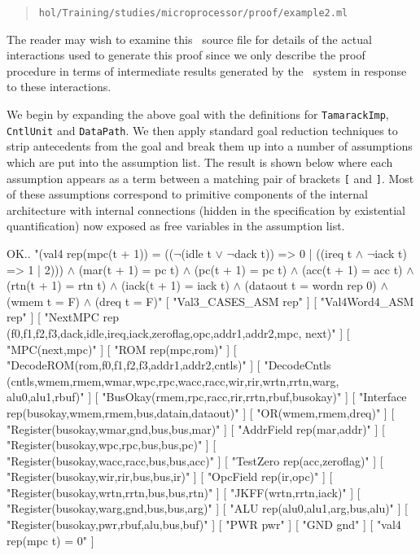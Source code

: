 \begin{quote}
\verb"hol/Training/studies/microprocessor/proof/example2.ml"
\end{quote}

The reader may wish to examine this \HOL\ source file for details
of the actual interactions used to generate this proof
since we only describe the proof procedure in terms
of intermediate results generated by the \HOL\ system
in response to these interactions.

We begin by expanding the above goal with the definitions
for \verb"TamarackImp", \verb"CntlUnit" and \verb"DataPath".
We then apply standard goal reduction techniques
to strip antecedents from the goal
and break them up into a number of assumptions which are put into
the assumption list.
The result is shown below where each assumption appears as a
term between a matching pair of brackets \verb"[" and \verb"]".
Most of these assumptions correspond to primitive components
of the internal architecture with internal connections
(hidden in the specification by existential quantification)
now exposed as free variables in the assumption list.

\begintt
OK..
"(val4 rep(mpc(t + 1)) =
  ((\(\neg\)(idle t \(\vee\) \(\neg\)dack t)) => 0 | ((ireq t \(\wedge\) \(\neg\)iack t) => 1 | 2))) \(\wedge\)
 (mar(t + 1) = pc t) \(\wedge\)
 (pc(t + 1) = pc t) \(\wedge\)
 (acc(t + 1) = acc t) \(\wedge\)
 (rtn(t + 1) = rtn t) \(\wedge\)
 (iack(t + 1) = iack t) \(\wedge\)
 (dataout t = wordn rep 0) \(\wedge\)
 (wmem t = F) \(\wedge\)
 (dreq t = F)"
    [ "Val3_CASES_ASM rep" ]
    [ "Val4Word4_ASM rep" ]
    [ "NextMPC 
       rep
       (f0,f1,f2,f3,dack,idle,ireq,iack,zeroflag,opc,addr1,addr2,mpc,
        next)" ]
    [ "MPC(next,mpc)" ]
    [ "ROM rep(mpc,rom)" ]
    [ "DecodeROM(rom,f0,f1,f2,f3,addr1,addr2,cntls)" ]
    [ "DecodeCntls
       (cntls,wmem,rmem,wmar,wpc,rpc,wacc,racc,wir,rir,wrtn,rrtn,warg,
        alu0,alu1,rbuf)" ]
    [ "BusOkay(rmem,rpc,racc,rir,rrtn,rbuf,busokay)" ]
    [ "Interface rep(busokay,wmem,rmem,bus,datain,dataout)" ]
    [ "OR(wmem,rmem,dreq)" ]
    [ "Register(busokay,wmar,gnd,bus,bus,mar)" ]
    [ "AddrField rep(mar,addr)" ]
    [ "Register(busokay,wpc,rpc,bus,bus,pc)" ]
    [ "Register(busokay,wacc,racc,bus,bus,acc)" ]
    [ "TestZero rep(acc,zeroflag)" ]
    [ "Register(busokay,wir,rir,bus,bus,ir)" ]
    [ "OpcField rep(ir,opc)" ]
    [ "Register(busokay,wrtn,rrtn,bus,bus,rtn)" ]
    [ "JKFF(wrtn,rrtn,iack)" ]
    [ "Register(busokay,warg,gnd,bus,bus,arg)" ]
    [ "ALU rep(alu0,alu1,arg,bus,alu)" ]
    [ "Register(busokay,pwr,rbuf,alu,bus,buf)" ]
    [ "PWR pwr" ]
    [ "GND gnd" ]
    [ "val4 rep(mpc t) = 0" ]

